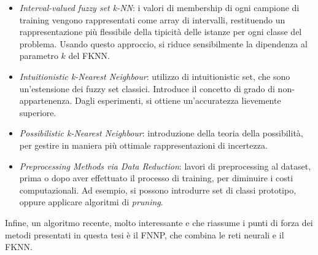 \documentclass[11pt]{article}
\begin{document}
\begin{itemize}
\item \textit{Interval-valued fuzzy set k-NN}: i valori di membership di ogni campione di training vengono rappresentati come array di intervalli, restituendo un rappresentazione più flessibile della tipicità delle istanze per ogni classe del problema. Usando questo approccio, si riduce sensibilmente la dipendenza al parametro $k$ del FKNN. 
\item \textit{Intuitionistic k-Nearest Neighbour}: utilizzo di intuitionistic set, che sono un'estensione dei fuzzy set classici. Introduce il concetto di grado di non-appartenenza. Dagli esperimenti, si ottiene un'accuratezza lievemente superiore. 
\item \textit{Possibilistic k-Nearest Neighbour}: introduzione della teoria della possibilità, per gestire in maniera più ottimale rappresentazioni di incertezza. 
\item \textit{Preprocessing Methods via Data Reduction}: lavori di preprocessing al dataset, prima o dopo aver effettuato il processo di training, per diminuire i costi computazionali. Ad esempio, si possono introdurre set di classi prototipo, oppure applicare algoritmi di \textit{pruning}.
\end{itemize}

Infine, un algoritmo recente, molto interessante e che riassume i punti di forza dei metodi presentati in questa tesi è il FNNP, che combina le reti neurali e il FKNN.\cite{FKNN-NN}
\end{document}
